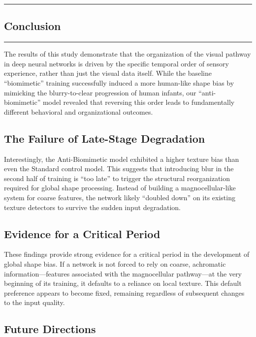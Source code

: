 {\color{gray}\hrule}
\begin{center}
\section{Conclusion}
\bigskip
\end{center}
{\color{gray}\hrule}
\vspace{0.5cm}

The results of this study demonstrate that the organization of the visual pathway in deep neural networks is driven by the specific temporal order of sensory experience, rather than just the visual data itself. While the baseline ``biomimetic'' training successfully induced a more human-like shape bias by mimicking the blurry-to-clear progression of human infants, our ``anti-biomimetic'' model revealed that reversing this order leads to fundamentally different behavioral and organizational outcomes.

\subsection{The Failure of Late-Stage Degradation}

Interestingly, the Anti-Biomimetic model exhibited a higher texture bias than even the Standard control model. This suggests that introducing blur in the second half of training is ``too late'' to trigger the structural reorganization required for global shape processing. Instead of building a magnocellular-like system for coarse features, the network likely ``doubled down'' on its existing texture detectors to survive the sudden input degradation.

\subsection{Evidence for a Critical Period}

These findings provide strong evidence for a critical period in the development of global shape bias. If a network is not forced to rely on coarse, achromatic information---features associated with the magnocellular pathway---at the very beginning of its training, it defaults to a reliance on local texture. This default preference appears to become fixed, remaining regardless of subsequent changes to the input quality.


\subsection{Future Directions}

